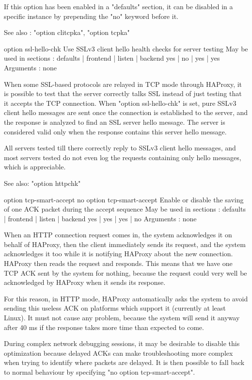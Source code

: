   If this option has been enabled in a "defaults" section, it can be disabled
  in a specific instance by prepending the "no" keyword before it.

  See also : "option clitcpka", "option tcpka"


option ssl-hello-chk
  Use SSLv3 client hello health checks for server testing
  May be used in sections :   defaults | frontend | listen | backend
                                 yes   |    no    |   yes  |   yes
  Arguments : none

  When some SSL-based protocols are relayed in TCP mode through HAProxy, it is
  possible to test that the server correctly talks SSL instead of just testing
  that it accepts the TCP connection. When "option ssl-hello-chk" is set, pure
  SSLv3 client hello messages are sent once the connection is established to
  the server, and the response is analyzed to find an SSL server hello message.
  The server is considered valid only when the response contains this server
  hello message.

  All servers tested till there correctly reply to SSLv3 client hello messages,
  and most servers tested do not even log the requests containing only hello
  messages, which is appreciable.

  See also: "option httpchk"


option tcp-smart-accept
no option tcp-smart-accept
  Enable or disable the saving of one ACK packet during the accept sequence
  May be used in sections :   defaults | frontend | listen | backend
                                 yes   |    yes   |   yes  |    no
  Arguments : none

  When an HTTP connection request comes in, the system acknowledges it on
  behalf of HAProxy, then the client immediately sends its request, and the
  system acknowledges it too while it is notifying HAProxy about the new
  connection. HAProxy then reads the request and responds. This means that we
  have one TCP ACK sent by the system for nothing, because the request could
  very well be acknowledged by HAProxy when it sends its response.

  For this reason, in HTTP mode, HAProxy automatically asks the system to avoid
  sending this useless ACK on platforms which support it (currently at least
  Linux). It must not cause any problem, because the system will send it anyway
  after 40 ms if the response takes more time than expected to come.

  During complex network debugging sessions, it may be desirable to disable
  this optimization because delayed ACKs can make troubleshooting more complex
  when trying to identify where packets are delayed. It is then possible to
  fall back to normal behaviour by specifying "no option tcp-smart-accept".

